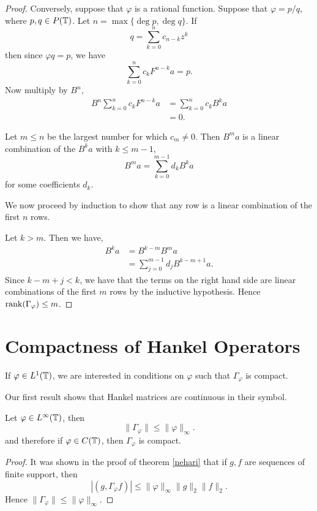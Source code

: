 \documentclass{unswmaths}
\begin{document}
\begin{proof}
    Conversely, suppose that $\varphi$ is a rational function. Suppose
    that $\varphi = p/q$, where $p,q \in P(\mathbb{T})$. 
    Let $n = \max\{\deg p,\deg q\}$.
    If 
    \begin{equation*}
        q = \sum_{k=0}^n c_{n-k}z^k
    \end{equation*}
    then since $\varphi q = p$, we have
    \begin{equation*}
        \sum_{k=0}^n c_k F^{n-k} a = p.
    \end{equation*}
    Now multiply by $B^n$,
    \begin{align*}
        B^n\sum_{k=0}^n  c_k F^{n-k} a &= \sum_{k=0}^n c_k B^k a\\
        &= 0.
    \end{align*}
    
    Let $m \leq n$ be the largest number for which $c_m \neq 0$. Then $B^m a$
    is a linear combination of the $B^k a$ with $k \leq m-1$,
    \begin{equation*}
        B^m a = \sum_{k=0}^{m-1} d_k B^k a
    \end{equation*}
    for some coefficients $d_k$. 
    
    We now proceed by induction to show that any row is a linear combination
    of the first $n$ rows. 
    
    Let $k > m$. Then we have,
    \begin{align*}
        B^k a &= B^{k-m} B^m a\\
        &= \sum_{j=0}^{m-1} d_j B^{k-m+1}a.
    \end{align*}
    Since $k-m+j < k$, we have that the terms on the right hand side are
    linear combinations of the first $m$ rows by the inductive hypothesis.
    Hence $\operatorname{rank}(\Gamma_\varphi) \leq m$. 
\end{proof}

\section{Compactness of Hankel Operators}
If $\varphi \in L^1(\mathbb{T})$, we are interested in conditions
on $\varphi$ such that $\Gamma_\varphi$ is compact. 

Our first result shows that Hankel matrices are continuous in their symbol.
\begin{proposition}
    Let $\varphi \in L^\infty(\mathbb{T})$, then
    \begin{equation*}
        \|\Gamma_\varphi\| \leq \|\varphi\|_\infty.
    \end{equation*}
    and therefore if $\varphi \in C(\mathbb{T})$, then $\Gamma_\varphi$ is compact.
\end{proposition}
\begin{proof}
    It was shown in the proof of theorem \ref{nehari} that if $g,f$ are sequences
    of finite support, then
    \begin{equation*}
        |(g,\Gamma_\varphi f)| \leq \|\varphi\|_\infty \|g\|_2\|f\|_2.
    \end{equation*}
    Hence $\|\Gamma_\varphi\| \leq \|\varphi\|_\infty$.
\end{proof}
\end{document}

